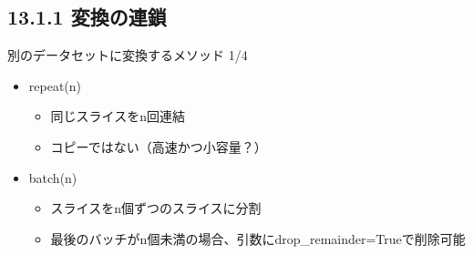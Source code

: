 \documentclass[aspectratio=169, dvipdfmx, 14pt, xcolor={svgnames,dvipsnames}, t]{beamer}
\begin{document}

\hypertarget{ux5909ux63dbux306eux9023ux9396}{%
  \subsection{13.1.1 変換の連鎖}\label{ux5909ux63dbux306eux9023ux9396}}


\begin{frame}{別のデータセットに変換するメソッド 1/4}\label{ux5225ux306eux30c7ux30fcux30bfux30bbux30c3ux30c8ux306bux5909ux63dbux3059ux308bux30e1ux30bdux30c3ux30c9-14}

  \begin{itemize}
    \tightlist
    \item
          repeat(n)

          \begin{itemize}
            \tightlist
            \item
                  同じスライスをn回連結
            \item
                  コピーではない（高速かつ小容量？）
          \end{itemize}
    \item
          batch(n)

          \begin{itemize}
            \tightlist
            \item
                  スライスをn個ずつのスライスに分割
            \item
                  最後のバッチがn個未満の場合、引数にdrop\_remainder=Trueで削除可能
          \end{itemize}
  \end{itemize}

\end{frame}

\end{document}
